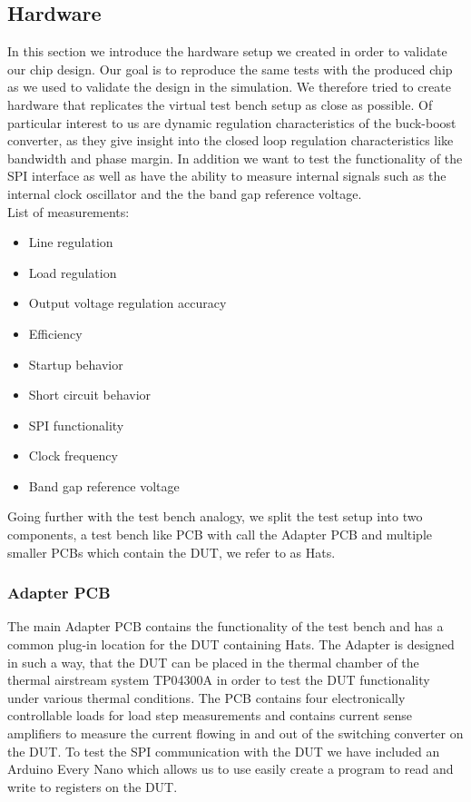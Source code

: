 \subsection{Hardware}
In this section we introduce the hardware setup we created in order to validate our chip design. 
Our goal is to reproduce the same tests with the produced chip as we used to validate the design in the simulation. We therefore tried to create hardware that replicates the virtual test bench setup as close as possible. Of particular interest to us are dynamic regulation characteristics of the buck-boost converter, as they give insight into the closed loop regulation characteristics like bandwidth and phase margin. In addition we want to test the functionality of the SPI interface as well as have the ability to measure internal signals such as the internal clock oscillator and the the band gap reference voltage. \\
List of measurements:
\begin{itemize}
    \item Line regulation
    \item Load regulation
    \item Output voltage regulation accuracy 
    \item Efficiency
    \item Startup behavior
    \item Short circuit behavior
    \item SPI functionality
    \item Clock frequency
    \item Band gap reference voltage
\end{itemize}

Going further with the test bench analogy, we split the test setup into two components, a test bench like PCB with call the Adapter PCB and multiple smaller PCBs which contain the \ac{DUT}, we refer to as Hats.


\subsubsection{Adapter PCB}
The main Adapter PCB contains the functionality of the test bench and has a common plug-in location for the \ac{DUT} containing Hats. The Adapter is designed in such a way, that the \ac{DUT} can be placed in the thermal chamber of the thermal airstream system TP04300A in order to test the \ac{DUT} functionality under various thermal conditions. The PCB contains four electronically controllable loads for load step measurements and contains current sense amplifiers to measure the current flowing in and out of the switching converter on the \ac{DUT}. To test the SPI communication with the \ac{DUT} we have included an Arduino Every Nano which allows us to use easily create a program to read and write to registers on the \ac{DUT}.

